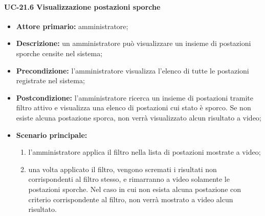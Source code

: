 \paragraph{UC-21.6 Visualizzazione postazioni sporche}
\begin{itemize}
    \item \textbf{Attore primario:} amministratore;
    \item \textbf{Descrizione:} un amministratore pu\`{o} visualizzare un insieme di postazioni sporche censite nel sistema;
    \item \textbf{Precondizione:} l'amministratore visualizza l'elenco di tutte le postazioni registrate nel sistema;
    \item \textbf{Postcondizione:} l'amministratore ricerca un insieme di postazioni tramite filtro attivo e visualizza una elenco di postazioni cui stato è sporco. Se non esiste alcuna postazione sporca, non verrà visualizzato alcun risultato a video;
    \item \textbf{Scenario principale:}
    \begin{enumerate}
        \item l'amministratore applica il filtro nella lista di postazioni mostrate a video;
        \item una volta applicato il filtro, vengono scremati i risultati non corrispondenti al filtro stesso, e rimarranno a video solamente le postazioni sporche. Nel caso in cui non esista alcuna postazione con criterio corrispondente al filtro, non verrà mostrato a video alcun risultato.
    \end{enumerate}
\end{itemize}

